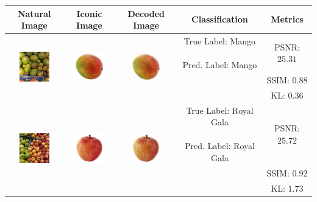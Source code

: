
\begin{tabular}{c c c c c}
	\toprule 
	{\bf Natural Image} & {\bf Iconic Image} &
	{\bf Decoded Image} & {\bf Classification} & {\bf Metrics}  \\
	\midrule 
	\multirow{3}{*}{\includegraphics[width=13mm, height=13mm]{PaperB/figures_and_tables/decoded_iconic_images/Mango_002_image477.jpg}} & \multirow{3}{*}{\includegraphics[width=13mm, height=13mm]{PaperB/figures_and_tables/iconic_image_figures/Mango_Iconic.jpg}} & \multirow{3}{*}{\includegraphics[width=13mm, height=13mm]{PaperB/figures_and_tables/decoded_iconic_images/vcca_xiwy_NEW/mango_image477.png}} & \multirowcell{3}{True Label: Mango\\ \\ Pred. Label: Mango} & PSNR: $25.31$ \\
	& & & & SSIM: $0.88$ \\
	& & & & KL: $0.36$ \\
	
	\midrule
	\multirow{3}{*}{\includegraphics[width=13mm, height=13mm]{PaperB/figures_and_tables/decoded_iconic_images/Royal-Gala_055.jpg}} & \multirow{3}{*}{\includegraphics[width=13mm, height=13mm]{PaperB/figures_and_tables/iconic_image_figures/Royal-Gala-Apple_Clean.jpg}} & \multirow{3}{*}{\includegraphics[width=13mm, height=13mm]{PaperB/figures_and_tables/decoded_iconic_images/vcca_xiwy_NEW/royal_gala_image266.png}} & \multirowcell{3}{True Label: Royal Gala\\ \\ Pred. Label: Royal Gala} & PSNR: $25.72$ \\
	& & & & SSIM: $0.92$ \\
	& & & & KL: $1.73$ \\
	

\end{tabular}
